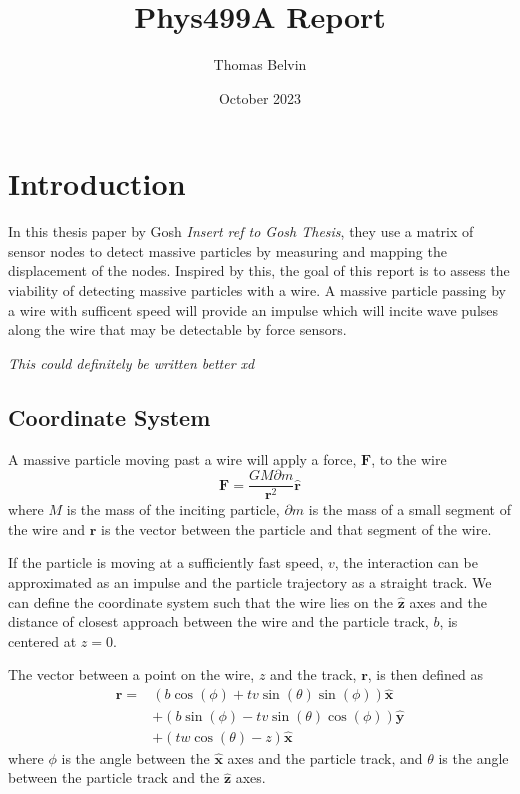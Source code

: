 \documentclass{report}
\title{Phys499A Report}
\author{Thomas Belvin}
\date{October 2023}
\begin{document}
\maketitle
\chapter*{Introduction}
In this thesis paper by Gosh \emph{Insert ref to Gosh Thesis}, they use a matrix of sensor nodes to detect massive particles by measuring and mapping the displacement of the nodes.
Inspired by this, the goal of this report is to assess the viability of detecting massive particles with a wire.
A massive particle passing by a wire with sufficent speed will provide an impulse which will incite wave pulses along the wire that may be detectable by force sensors. 

\emph{This could definitely be written better xd}
\section*{Coordinate System}
A massive particle moving past a wire will apply a force, $\mathbf{F}$, to the wire 
\begin{equation}
    \mathbf{F} = \frac{G M \partial m}{\mathbf{r}^2} \mathbf{\hat r}
    \label{eqn:force}
\end{equation}
where $M$ is the mass of the inciting particle, $\partial m$ is the mass of a small segment of the wire and $\mathbf{r}$ is the vector between the particle and that segment of the wire.

If the particle is moving at a sufficiently fast speed, $v$, the  interaction can be approximated as an impulse and the particle trajectory as a straight track. We can define the coordinate system such that the wire lies on the $\mathbf{\hat z}$ axes and the distance of closest approach between the wire and the particle track, $b$, is centered at $z = 0$.

The vector between a point on the wire, $z$ and the track, $\mathbf{r}$, is then defined as
\begin{align}
    \nonumber \mathbf{r}=& (b \cos (\phi )+t v \sin (\theta ) \sin (\phi )) \mathbf{\hat x} \\
               \nonumber & +(b \sin (\phi )-t v \sin (\theta ) \cos (\phi )) \mathbf{\hat y}\\
                         & + (t w \cos (\theta )-z) \mathbf{\hat x}
    \label{eqn:r}
\end{align}
where $\phi$ is the angle between the $\mathbf{\hat x}$ axes and the particle track, and $\theta$ is the angle between the particle track and the $\mathbf{\hat z}$ axes.
\end{document}
